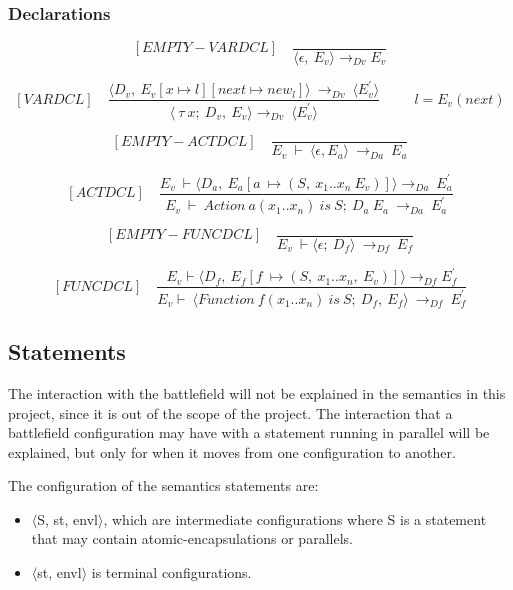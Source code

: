   \subsubsection{Declarations}
  	\[
	[EMPTY-VARDCL] \quad
	\dfrac{}{\langle\epsilon, \ E_v\rangle \rightarrow_{Dv} E_v}
	\]
    	
   	\[
   	[VARDCL] \quad
   	\dfrac{ \langle D_v, \ E_v[x \mapsto l][next \mapsto new_l]\rangle \ \rightarrow_{Dv} \ \langle E_v^{'} \rangle }{ \langle \ \tau \ x; \ D_v,\ E_v \rangle \rightarrow_{Dv} \ \langle E_v^{'} \rangle }
   	\qquad \ \ l = E_v(next)
   	\]
    	
   	\[
   	[EMPTY-ACTDCL] \quad
   	\dfrac{}{E_v \ \vdash \ \langle \epsilon, E_a \rangle \ \rightarrow_{Da} \ E_a}
   	\]
    	
    	
  	\[
   	[ACTDCL] \quad
   	\dfrac{E_v \ \vdash \langle D_a, \ E_a[a \ \mapsto (S, \ x_1 .. x_n \ E_v)] \rangle \rightarrow_{Da} \ E_a^{'}}{E_v \ \vdash \ Action \ a(x_1 .. x_n) \ is \ S; \ D_a \ E_a \ \rightarrow_{Da} \ E_a^{'}}
   	\]
    	
   	\[
   	[EMPTY-FUNCDCL] \quad
   	\dfrac{}{E_v \ \vdash \langle \epsilon; \ D_f \rangle \ \rightarrow_{Df} \ E_f}
   	\]
   	
   	\[
   	[FUNCDCL] \quad
   	\dfrac{E_v \vdash \langle D_f, \ E_f[f \ \mapsto (S, \ x_1 .. x_n, \ E_v)] \rangle \rightarrow_{Df} E_f^{'}}{E_v \vdash \ \langle Function \ f(x_1 .. x_n) \ is \ S; \ D_f, \ E_f \rangle \ \rightarrow_{Df} \ E_f^{'}}
   	\]
   	\subsection{Statements}
   	The interaction with the battlefield will not be explained in the semantics in this project, since it is out of the scope of the project. The interaction that a battlefield configuration may have with a statement running in parallel will be explained, but only for when it moves from one configuration to another.
   	
   	The configuration of the semantics statements are:
   	
   	\begin{itemize}
   		\item \begin{math} \langle \end{math}S, st, envl\begin{math} \rangle \end{math}, which are intermediate configurations where S is a statement that may contain atomic-encapsulations or parallels.
   		\item \begin{math} \langle \end{math}st, envl\begin{math} \rangle \end{math} is terminal configurations.
   	\end{itemize}
   	
